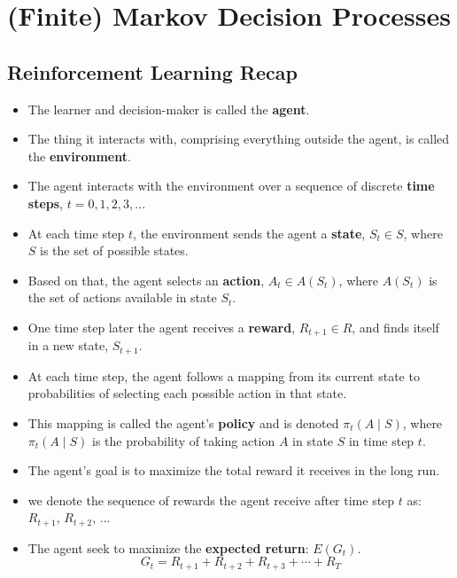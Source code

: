 \chapter{(Finite) Markov Decision Processes \cite{medium-introduction-to-reinforcement-learning-rl-part-3-finite-markov-decision-processes-51e1f8d3ddb7}}

\section{Reinforcement Learning Recap}


\begin{itemize}
    \item The learner and decision-maker is called the \textbf{agent}.
    \item The thing it interacts with, comprising everything outside the agent, is called the \textbf{environment}.
    \item The agent interacts with the environment over a sequence of discrete \textbf{time steps}, $t = 0, 1, 2, 3, ...$
    \item At each time step $t$, the environment sends the agent a \textbf{state}, $S_t \in S$, where $S$ is the set of possible states.
    \item Based on that, the agent selects an \textbf{action}, $A_t \in A(S_t)$, where $A(S_t)$ is the set of actions available in state $S_t$.
    \item One time step later the agent receives a \textbf{reward}, $R_{t+1} \in R$, and finds itself in a new state, $S_{t+1}$.
    \item At each time step, the agent follows a mapping from its current state to probabilities of selecting each possible action in that state.
    \item This mapping is called the agent’s \textbf{policy} and is denoted $\pi_t(A \mid S)$, where $\pi_t(A \mid S)$ is the probability of taking action $A$ in state $S$ in time step $t$.
    \item The agent’s goal is to maximize the total reward it receives in the long run.
    \item we denote the sequence of rewards the agent receive after time step $t$ as: $R_{t+1}$, $R_{t+2}$, ...
    \item The agent seek to maximize the \textbf{expected return}: $E(G_t)$.
    \[
        G_t = R_{t+1} +R_{t+2} +R_{t+3} + \cdots + R_T
\]
\end{itemize}
